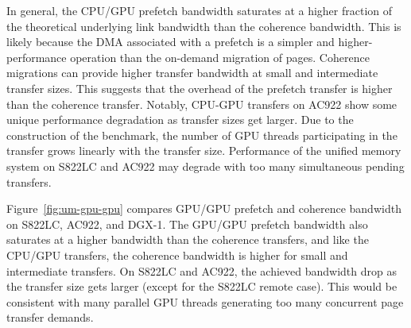 In general, the CPU/GPU prefetch bandwidth saturates at a higher fraction of the theoretical underlying link bandwidth than the coherence bandwidth.
This is likely because the DMA associated with a prefetch is a simpler and higher-performance operation than the on-demand migration of pages.
Coherence migrations can provide higher transfer bandwidth at small and intermediate transfer sizes.
This suggests that the overhead of the prefetch transfer is higher than the coherence transfer.
Notably, CPU-GPU transfers on AC922 show some unique performance degradation as transfer sizes get larger.
Due to the construction of the benchmark, the number of GPU threads participating in the transfer grows linearly with the transfer size.
Performance of the unified memory system on S822LC and AC922 may degrade with too many simultaneous pending transfers.

Figure~\ref{fig:um-gpu-gpu} compares GPU/GPU prefetch and coherence bandwidth on S822LC, AC922, and DGX-1.
The GPU/GPU prefetch bandwidth also saturates at a higher bandwidth than the coherence transfers, and like the CPU/GPU transfers, the coherence bandwidth is higher for small and intermediate transfers.
On S822LC and AC922, the achieved bandwidth drop as the transfer size gets larger (except for the S822LC remote case).
This would be consistent with many parallel GPU threads generating too many concurrent page transfer demands.


